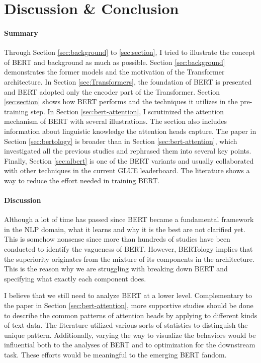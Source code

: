 \documentclass[letterpaper, 11pt]{article}
\begin{document}
\section{Discussion \& Conclusion}
\label{sec:conclusion}
\paragraph{Summary}
Through Section \ref{sec:background} to \ref{sec:section}, I tried to illustrate the concept of BERT and background as much as possible. Section \ref{sec:background} demonstrates the former models and the motivation of the Transformer architecture. In Section \ref{sec:Transformers}, the foundation of BERT is presented and BERT adopted only the encoder part of the Transformer. Section \ref{sec:section} shows how BERT performs and the techniques it utilizes in the pre-training step. In Section \ref{sec:bert-attention}, I scrutinized the attention mechanism of BERT with several illustrations. The section also includes information about linguistic knowledge the attention heads capture. The paper in Section \ref{sec:bertology} is broader than in Section \ref{sec:bert-attention}, which investigated all the previous studies and rephrased them into several key points. Finally, Section \ref{sec:albert} is one of the BERT variants and usually collaborated with other techniques in the current GLUE leaderboard. The literature shows a way to reduce the effort needed in training BERT.

\paragraph{Discussion}
Although a lot of time has passed since BERT became a fundamental framework in the NLP domain, what it learns and why it is the best are not clarified yet. This is somehow nonsense since more than hundreds of studies have been conducted to identify the vagueness of BERT. However, BERTology implies that the superiority originates from the mixture of its components in the architecture. This is the reason why we are struggling with breaking down BERT and specifying what exactly each component does.

I believe that we still need to analyze BERT at a lower level. Complementary to the paper in Section \ref{sec:bert-attention}, more supportive studies should be done to describe the common patterns of attention heads by applying to different kinds of text data. The literature utilized various sorts of statistics to distinguish the unique pattern. Additionally, varying the way to visualize the behaviors would be influential both to the analyses of BERT and to optimization for the downstream task. These efforts would be meaningful to the emerging BERT fandom.
\end{document}
